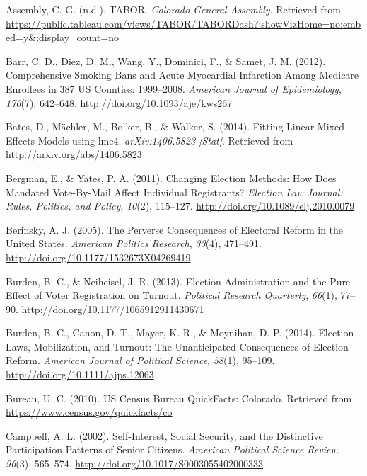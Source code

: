 \documentclass[12pt,twoside]{reedthesis}
\begin{document}
  \hypertarget{ref-colorado_general_assembly_tabor_nodate}{}
  Assembly, C. G. (n.d.). TABOR. \emph{Colorado General Assembly}.
  Retrieved from
  \url{https://public.tableau.com/views/TABOR/TABORDash?:showVizHome=no:embed=y\&:display_count=no}
  
  \hypertarget{ref-barr_comprehensive_2012}{}
  Barr, C. D., Diez, D. M., Wang, Y., Dominici, F., \& Samet, J. M.
  (2012). Comprehensive Smoking Bans and Acute Myocardial Infarction Among
  Medicare Enrollees in 387 US Counties: 1999--2008. \emph{American
  Journal of Epidemiology}, \emph{176}(7), 642--648.
  \url{http://doi.org/10.1093/aje/kws267}
  
  \hypertarget{ref-bates_fitting_2014}{}
  Bates, D., Mächler, M., Bolker, B., \& Walker, S. (2014). Fitting Linear
  Mixed-Effects Models using lme4. \emph{arXiv:1406.5823 {[}Stat{]}}.
  Retrieved from \url{http://arxiv.org/abs/1406.5823}
  
  \hypertarget{ref-bergman_changing_2011}{}
  Bergman, E., \& Yates, P. A. (2011). Changing Election Methods: How Does
  Mandated Vote-By-Mail Affect Individual Registrants? \emph{Election Law
  Journal: Rules, Politics, and Policy}, \emph{10}(2), 115--127.
  \url{http://doi.org/10.1089/elj.2010.0079}
  
  \hypertarget{ref-berinsky_perverse_2005}{}
  Berinsky, A. J. (2005). The Perverse Consequences of Electoral Reform in
  the United States. \emph{American Politics Research}, \emph{33}(4),
  471--491. \url{http://doi.org/10.1177/1532673X04269419}
  
  \hypertarget{ref-burden_election_2013}{}
  Burden, B. C., \& Neiheisel, J. R. (2013). Election Administration and
  the Pure Effect of Voter Registration on Turnout. \emph{Political
  Research Quarterly}, \emph{66}(1), 77--90.
  \url{http://doi.org/10.1177/1065912911430671}
  
  \hypertarget{ref-burden_election_2014}{}
  Burden, B. C., Canon, D. T., Mayer, K. R., \& Moynihan, D. P. (2014).
  Election Laws, Mobilization, and Turnout: The Unanticipated Consequences
  of Election Reform. \emph{American Journal of Political Science},
  \emph{58}(1), 95--109. \url{http://doi.org/10.1111/ajps.12063}
  
  \hypertarget{ref-us_census_bureau_us_2010}{}
  Bureau, U. C. (2010). US Census Bureau QuickFacts: Colorado. Retrieved
  from \url{https://www.census.gov/quickfacts/co}
  
  \hypertarget{ref-campbell_self-interest_2002}{}
  Campbell, A. L. (2002). Self-Interest, Social Security, and the
  Distinctive Participation Patterns of Senior Citizens. \emph{American
  Political Science Review}, \emph{96}(3), 565--574.
  \url{http://doi.org/10.1017/S0003055402000333}
  
\end{document}
